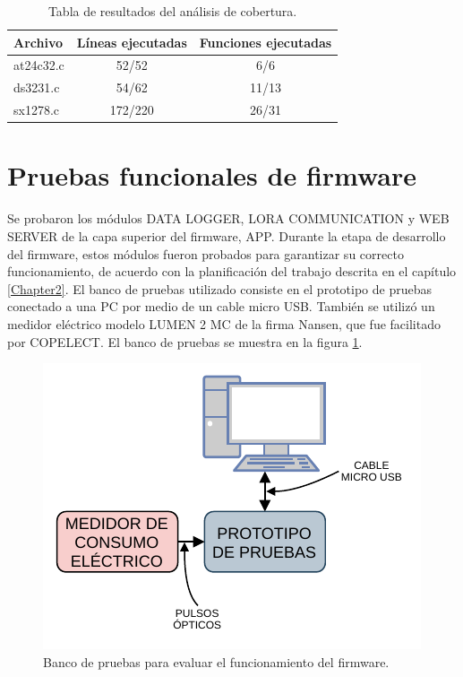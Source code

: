 \begin{table}[h]
	\centering
	\caption[Análisis de cobertura]{Tabla de resultados del análisis de cobertura.}
	\begin{tabular}{l c c}    
		\toprule
		\textbf{Archivo} & \textbf{Líneas ejecutadas} & \textbf{Funciones ejecutadas}  \\
		\midrule
		at24c32.c & 52/52 & 6/6 \\		
		ds3231.c & 54/62 & 11/13 \\
		sx1278.c & 172/220 & 26/31 \\
		\bottomrule
		\hline
	\end{tabular}
	\label{tab:coverAnalysis}
\end{table}


\section{Pruebas funcionales de firmware}
\label{sec:pruebasFW}

Se probaron los módulos DATA LOGGER, LORA COMMUNICATION y WEB SERVER de la capa superior del firmware, APP. Durante la etapa de desarrollo del firmware, estos módulos fueron probados para garantizar su correcto funcionamiento, de acuerdo con la planificación del trabajo descrita en el capítulo \ref{Chapter2}. El banco de pruebas utilizado consiste en el prototipo de pruebas conectado a una PC por medio de un cable micro USB. También se utilizó un medidor eléctrico modelo LUMEN 2 MC de la firma Nansen, que fue facilitado por COPELECT. El banco de pruebas se muestra en la figura \ref{fig:testFunctional}.

\begin{figure}[ht]
	\centering
	\includegraphics[scale=1.2]{./Figures/test_firmware_functional.pdf}
	\caption{Banco de pruebas para evaluar el funcionamiento del firmware.}
	\label{fig:testFunctional}
\end{figure}

